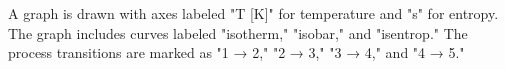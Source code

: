 A graph is drawn with axes labeled "T [K]" for temperature and "s" for entropy. The graph includes curves labeled "isotherm," "isobar," and "isentrop." The process transitions are marked as "1 → 2," "2 → 3," "3 → 4," and "4 → 5."